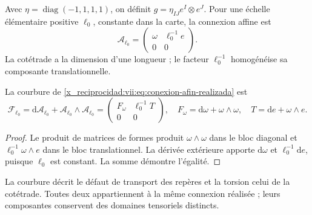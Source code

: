 Avec \(\eta=\operatorname{diag}(-1,1,1,1)\), on définit
\(g=\eta_{IJ}e^I\otimes e^J\). Pour une échelle élémentaire
positive \(\ell_0\), constante dans la carte, la connexion affine est
\begin{equation}
 \mathcal A_{\ell_0}
 =\begin{pmatrix}\omega&\ell_0^{-1}e\\0&0\end{pmatrix}.
 \label{x_reciprocidad:vii:eq:conexion-afin-realizada}
\end{equation}
La cotétrade a la dimension d'une longueur ; le facteur \(\ell_0^{-1}\) homogénéise sa composante translationnelle.

\begin{proposition}
\label{x_reciprocidad:vii:prop:curvatura-afin}
La courbure de \eqref{x_reciprocidad:vii:eq:conexion-afin-realizada} est
\begin{equation}
 \mathcal F_{\ell_0}
 =\mathrm d\mathcal A_{\ell_0}
   +\mathcal A_{\ell_0}\wedge\mathcal A_{\ell_0}
 =\begin{pmatrix}F_\omega&\ell_0^{-1}T\\0&0\end{pmatrix},
 \quad F_\omega=\mathrm d\omega+\omega\wedge\omega,
 \quad T=\mathrm de+\omega\wedge e.
 \label{x_reciprocidad:vii:eq:curvatura-afin-realizada}
\end{equation}
\end{proposition}
\begin{proof}
Le produit de matrices de formes produit \(\omega\wedge\omega\) dans le bloc diagonal et \(\ell_0^{-1}\omega\wedge e\) dans le bloc translationnel. La dérivée extérieure apporte \(\mathrm d\omega\) et \(\ell_0^{-1}\mathrm de\), puisque \(\ell_0\) est constant. La somme démontre l'égalité.
\end{proof}

La courbure décrit le défaut de transport des repères et la torsion
celui de la cotétrade. Toutes deux appartiennent à la même connexion réalisée ;
leurs composantes conservent des domaines tensoriels distincts.

